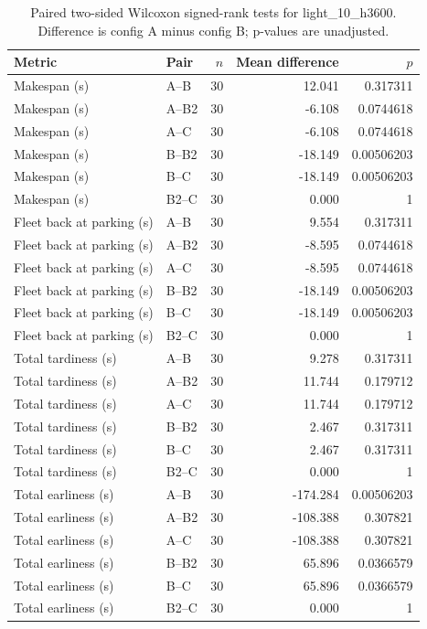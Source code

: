 \begin{table}[t]
\centering
\caption{Paired two-sided Wilcoxon signed-rank tests for light\_10\_h3600. Difference is config A minus config B; p-values are unadjusted.}
\label{tab:light-10-h3600-paired}
\begin{tabular}{llrrr}
\toprule
Metric & Pair & $n$ & Mean difference & $p$ \\
\midrule
Makespan (s) & A--B & 30 & 12.041 & 0.317311 \\
Makespan (s) & A--B2 & 30 & -6.108 & 0.0744618 \\
Makespan (s) & A--C & 30 & -6.108 & 0.0744618 \\
Makespan (s) & B--B2 & 30 & -18.149 & 0.00506203 \\
Makespan (s) & B--C & 30 & -18.149 & 0.00506203 \\
Makespan (s) & B2--C & 30 & 0.000 & 1 \\
Fleet back at parking (s) & A--B & 30 & 9.554 & 0.317311 \\
Fleet back at parking (s) & A--B2 & 30 & -8.595 & 0.0744618 \\
Fleet back at parking (s) & A--C & 30 & -8.595 & 0.0744618 \\
Fleet back at parking (s) & B--B2 & 30 & -18.149 & 0.00506203 \\
Fleet back at parking (s) & B--C & 30 & -18.149 & 0.00506203 \\
Fleet back at parking (s) & B2--C & 30 & 0.000 & 1 \\
Total tardiness (s) & A--B & 30 & 9.278 & 0.317311 \\
Total tardiness (s) & A--B2 & 30 & 11.744 & 0.179712 \\
Total tardiness (s) & A--C & 30 & 11.744 & 0.179712 \\
Total tardiness (s) & B--B2 & 30 & 2.467 & 0.317311 \\
Total tardiness (s) & B--C & 30 & 2.467 & 0.317311 \\
Total tardiness (s) & B2--C & 30 & 0.000 & 1 \\
Total earliness (s) & A--B & 30 & -174.284 & 0.00506203 \\
Total earliness (s) & A--B2 & 30 & -108.388 & 0.307821 \\
Total earliness (s) & A--C & 30 & -108.388 & 0.307821 \\
Total earliness (s) & B--B2 & 30 & 65.896 & 0.0366579 \\
Total earliness (s) & B--C & 30 & 65.896 & 0.0366579 \\
Total earliness (s) & B2--C & 30 & 0.000 & 1 \\

\end{tabular}
\end{table}
